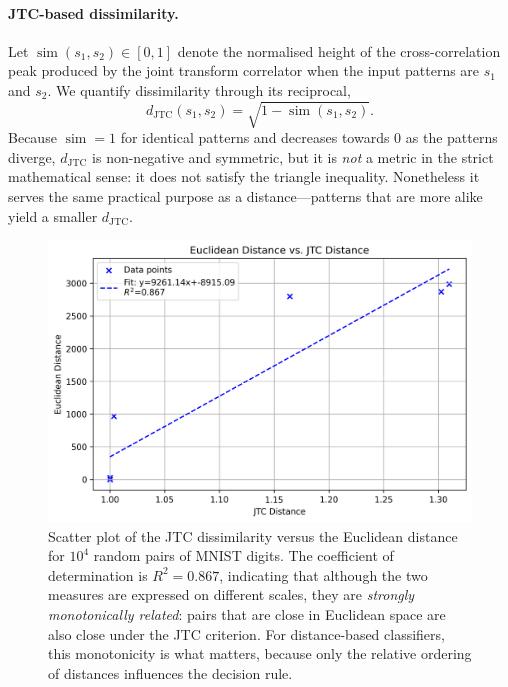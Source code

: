 \documentclass[twocolumn]{article} %
\begin{document}
\paragraph{JTC-based dissimilarity.}
Let \(\operatorname{sim}(s_{1},s_{2})\in[0,1]\) denote the normalised
height of the cross-correlation peak produced by the joint transform
correlator when the input patterns are \(s_{1}\) and \(s_{2}\).
We quantify dissimilarity through its reciprocal,
\[
  d_{\text{JTC}}(s_{1},s_{2})=\sqrt{1 - \operatorname{sim}(s_{1},s_{2})}.
\]
Because \(\operatorname{sim}=1\) for identical patterns and decreases
towards 0 as the patterns diverge, \(d_{\text{JTC}}\) is
non-negative and symmetric, but it is \emph{not} a metric in the strict
mathematical sense: it does not satisfy the triangle inequality. Nonetheless it serves the same practical
purpose as a distance—patterns that are more alike yield a smaller
\(d_{\text{JTC}}\).

\begin{figure}[htbp]
  \centering
  \includegraphics[width=\linewidth]{figures/correlation/euclidean_vs_jtc_distance.png}
  \caption{Scatter plot of the JTC dissimilarity versus the Euclidean
           distance for $10^4$ random pairs of MNIST digits.
           The coefficient of determination is
           \(R^{2}=0.867\), indicating that although the two measures are
           expressed on different scales, they are \emph{strongly
           monotonically related}: pairs that are close in Euclidean
           space are also close under the JTC criterion.  For
           distance-based classifiers, this monotonicity is what matters,
           because only the relative ordering of distances influences the
           decision rule.}
  \label{fig:euclidean_vs_jtc}
\end{figure}
\end{document}

